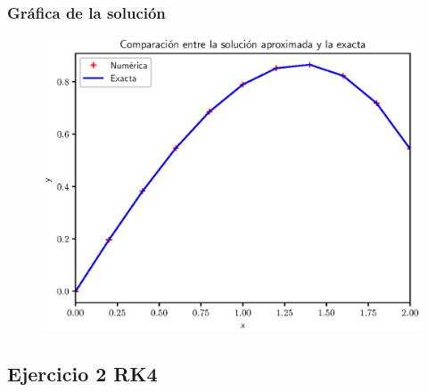 \documentclass[12pt]{beamer}
\begin{document}
\begin{frame}
\frametitle{Gráfica de la solución}
\begin{figure}
	\centering
	\includegraphics[scale=0.55]{Imagenes/plot_rk4_ejercicio_01.eps}
\end{figure}
\end{frame}

\subsection{Ejercicio 2 RK4}
\end{document}
